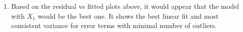 \documentclass{article}
\begin{document}
\begin{enumerate}
\item
  Based on the residual vs fitted plots above, it would appear that the
  model with \(X_1\) would be the best one. It shows the best linear fit
  and most consistent variance for error terms with minimal number of
  outliers.
\end{enumerate}


    
    
    
    
\end{document}
